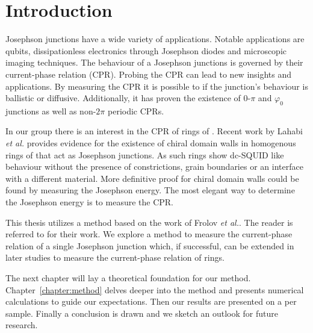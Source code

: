 \chapter{Introduction}
Josephson junctions have a wide variety of applications. Notable applications are qubits\cite{placeNewMaterialPlatform2021,pechenezhskiySuperconductingQuasichargeQubit2020}, dissipationless electronics through Josephson diodes\cite{zhangReconfigurableMagneticfieldfreeSuperconducting2023a,ciacciaGateTunableJosephson2023} and microscopic imaging techniques\cite{clarkeSQUIDHandbook2004,rogSQUIDontipMagneticMicroscopy2022,pranceSensitivityDCSQUID2023}. The behaviour of a Josephson junctions is governed by their current-phase relation (CPR). Probing the CPR can lead to new insights and applications. By measuring the CPR it is possible to if the junction's behaviour is ballistic or diffusive\cite{endresCurrentPhaseRelation2023,kayyalhaHighlySkewedCurrent2020}. Additionally, it has proven the existence of $0$-$\pi$ and $\varphi_0$ junctions\cite{frolovMeasurementCurrentPhaseRelation2004,muraniBallisticEdgeStates2017} as well as non-$2\pi$ periodic CPRs\cite{endresCurrentPhaseRelation2023}.

In our group there is an interest in the CPR of rings of . Recent work by Lahabi \textit{et al.} provides evidence for the existence of chiral domain walls in homogenous rings of \cite{lahabiSpintripletSupercurrentsOdd2018} that act as Josephson junctions. As such  rings show dc-SQUID like behaviour without the presence of constrictions, grain boundaries or an interface with a different material. More definitive proof for chiral domain walls could be found by measuring the Josephson energy\cite{lahabiSpintripletSupercurrentsOdd2018,sigristRoleDomainWalls1999}. The most elegant way to determine the Josephson energy is to measure the CPR.

This thesis utilizes a method based on the work of Frolov \textit{et al.}. The reader is referred to \cite{frolovMeasurementCurrentPhaseRelation2004,frolovCurrentphaseRelationsJosephson2005} for their work. We explore a method to measure the current-phase relation of a single Josephson junction which, if successful, can be extended in later studies to measure the current-phase relation of  rings.

The next chapter will lay a theoretical foundation for our method. Chapter~\ref{chapter:method} delves deeper into the method and presents numerical calculations to guide our expectations. Then our results are presented on a per sample. Finally a conclusion is drawn and we sketch an outlook for future research.